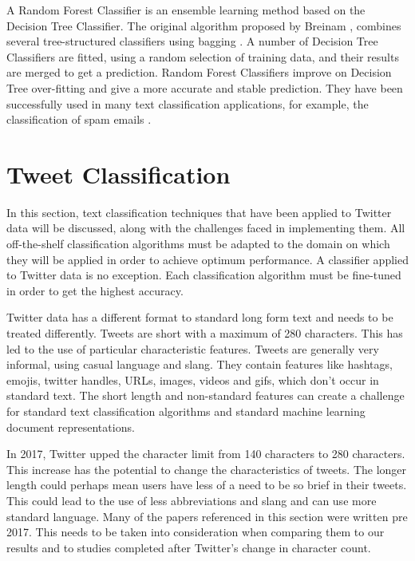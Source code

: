 A Random Forest Classifier is an ensemble learning method based on the Decision Tree Classifier. The original algorithm proposed by Breinam \cite{Breiman2001}, combines several tree-structured classifiers using bagging \cite{breiman1996bagging}. A number of Decision Tree Classifiers are fitted, using a random selection of training data, and their results are merged to get a prediction. Random Forest Classifiers improve on Decision Tree over-fitting and give a more accurate and stable prediction. They have been successfully used in many text classification applications, for example, the classification of spam emails \cite{akinyelu2014}.

\section{Tweet Classification}

In this section, text classification techniques that have been applied to Twitter data will be discussed, along with the challenges faced in implementing them. All off-the-shelf classification algorithms must be adapted to the domain on which they will be applied in order to achieve optimum performance. A classifier applied to Twitter data is no exception. Each classification algorithm must be fine-tuned in order to get the highest accuracy. 

Twitter data has a different format to standard long form text and needs to be treated differently. Tweets are short with a maximum of 280 characters. This has led to the use of particular characteristic features. Tweets are generally very informal, using casual language and slang. They contain features like hashtags, emojis, twitter handles, URLs, images, videos and gifs, which don't occur in standard text. The short length and non-standard features can create a challenge for standard text classification algorithms and standard machine learning document representations. 

In 2017, Twitter upped the character limit from 140 characters to 280 characters. This increase has the potential to change the characteristics of tweets. The longer length could perhaps mean users have less of a need to be so brief in their tweets. This could lead to the use of less abbreviations and slang and can use more standard language. Many of the papers referenced in this section were written pre 2017. This needs to be taken into consideration when comparing them to our results and to studies completed after Twitter's change in character count.

